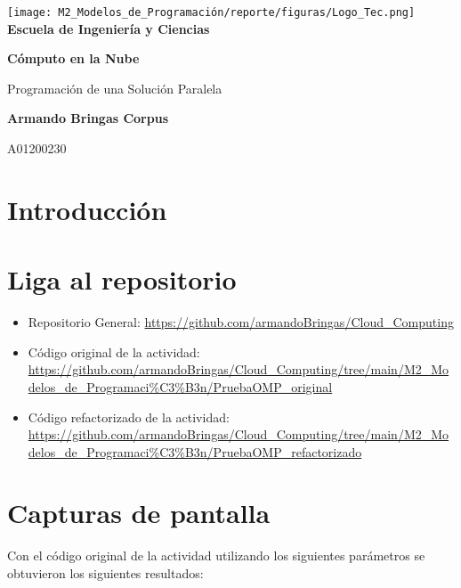 \documentclass[12pt,a4paper]{article}
\begin{document}
\begin{titlepage}
    \centering
    \texttt{[image: M2\_Modelos\_de\_Programación/reporte/figuras/Logo\_Tec.png]}\\
    \vspace{.5cm}
    \bfseries\large Escuela de Ingeniería y Ciencias
        
    \vspace{5cm}
    \centering
    \textbf{\Huge Cómputo en la Nube}
    \vspace{0.5cm}
        
    {\Large Programación de una Solución Paralela}

    \vspace{5cm}
        
    \textbf{\LARGE Armando Bringas Corpus}
        
    \vspace{0.5cm}
        
    {\large A01200230}
        
    \vfill
        
\end{titlepage}

\section{Introducción}


\section{Liga al repositorio}

\begin{itemize}
    \item Repositorio General: \url{https://github.com/armandoBringas/Cloud_Computing}
    \item Código original de la actividad: \url{https://github.com/armandoBringas/Cloud_Computing/tree/main/M2_Modelos_de_Programaci%C3%B3n/PruebaOMP_original}
    \item Código refactorizado de la actividad: \url{https://github.com/armandoBringas/Cloud_Computing/tree/main/M2_Modelos_de_Programaci%C3%B3n/PruebaOMP_refactorizado}
\end{itemize}


\section{Capturas de pantalla}
Con el código original de la actividad utilizando los siguientes parámetros se obtuvieron los siguientes resultados:
\end{document}

